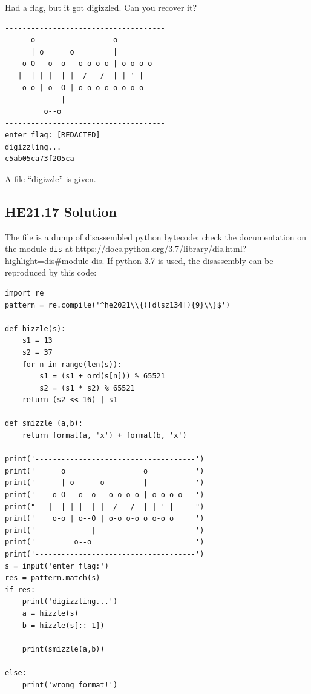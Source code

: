 \documentclass[english,a4paper,nols,noindent]{tufte-handout}
\begin{document}
\noindent Had a flag, but it got digizzled. Can you recover it?

\begin{verbatim}
-------------------------------------  
      o                  o             
      | o      o         |             
    o-O   o--o   o-o o-o | o-o o-o     
   |  | | |  | |  /   /  | |-' |       
    o-o | o--O | o-o o-o o o-o o       
             |                         
         o--o                          
-------------------------------------
enter flag: [REDACTED]    
digizzling...  
c5ab05ca73f205ca  
\end{verbatim}

A file ``digizzle'' is given.

\hypertarget{he21.17-solution}{%
\subsection{HE21.17 Solution}\label{he21.17-solution}}

\noindent The file is a dump of disassembled python bytecode; check the
documentation on the module \verb+dis+ at \url{https://docs.python.org/3.7/library/dis.html?highlight=dis#module-dis}.  If python 3.7 is used, the
disassembly can be reproduced by this code:

\begin{verbatim}
import re
pattern = re.compile('^he2021\\{([dlsz134]){9}\\}$')

def hizzle(s):
    s1 = 13
    s2 = 37
    for n in range(len(s)):
        s1 = (s1 + ord(s[n])) % 65521
        s2 = (s1 * s2) % 65521
    return (s2 << 16) | s1

def smizzle (a,b):
    return format(a, 'x') + format(b, 'x')

print('-------------------------------------')
print('      o                  o           ')
print('      | o      o         |           ')
print('    o-O   o--o   o-o o-o | o-o o-o   ')
print("   |  | | |  | |  /   /  | |-' |     ")
print('    o-o | o--O | o-o o-o o o-o o     ')
print('             |                       ')
print('         o--o                        ')
print('-------------------------------------')
s = input('enter flag:')
res = pattern.match(s)
if res:
    print('digizzling...')
    a = hizzle(s)
    b = hizzle(s[::-1])

    print(smizzle(a,b))

else:
    print('wrong format!')  
  \end{verbatim}
\end{document}
